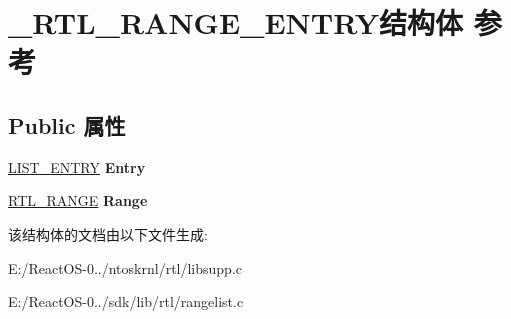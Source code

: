 \hypertarget{struct___r_t_l___r_a_n_g_e___e_n_t_r_y}{}\section{\+\_\+\+R\+T\+L\+\_\+\+R\+A\+N\+G\+E\+\_\+\+E\+N\+T\+R\+Y结构体 参考}
\label{struct___r_t_l___r_a_n_g_e___e_n_t_r_y}
\subsection*{Public 属性}
\begin{DoxyCompactItemize}
\item 
\mbox{\label{struct___r_t_l___r_a_n_g_e___e_n_t_r_y_a6ff3184b5cf3301bbb3d581dc1a24272}} 
\hyperlink{struct___l_i_s_t___e_n_t_r_y}{L\+I\+S\+T\+\_\+\+E\+N\+T\+RY} {\bfseries Entry}
\item 
\mbox{\label{struct___r_t_l___r_a_n_g_e___e_n_t_r_y_a992cdc935e991272fd04ad0efa37a0f7}} 
\hyperlink{struct___r_t_l___r_a_n_g_e}{R\+T\+L\+\_\+\+R\+A\+N\+GE} {\bfseries Range}
\end{DoxyCompactItemize}


该结构体的文档由以下文件生成\+:\begin{DoxyCompactItemize}
\item 
E\+:/\+React\+O\+S-\/0../ntoskrnl/rtl/libsupp.\+c\item 
E\+:/\+React\+O\+S-\/0../sdk/lib/rtl/rangelist.\+c\end{DoxyCompactItemize}
